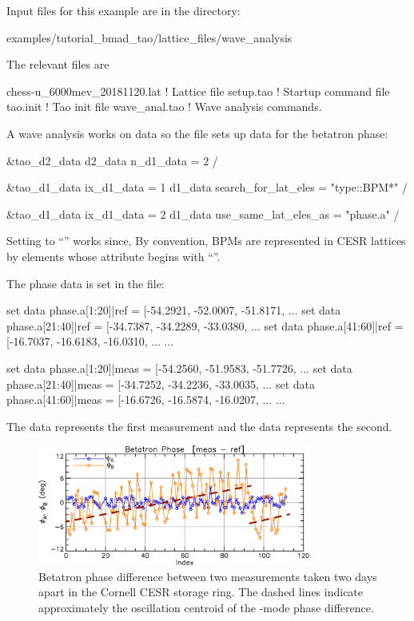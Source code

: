 \documentclass{hitec}     %
\begin{document}
Input files for this example are in the directory:
\begin{code}
examples/tutorial_bmad_tao/lattice_files/wave_analysis
\end{code}
The relevant files are 
\begin{code}
chess-u_6000mev_20181120.lat    ! Lattice file
setup.tao                       ! Startup command file
tao.init                        ! Tao init file
wave_anal.tao                   ! Wave analysis commands.
\end{code}

A wave analysis works on data so the  file sets up data for the betatron phase:
\begin{code}
&tao_d2_data
  d2_data%
  n_d1_data = 2
/

&tao_d1_data
  ix_d1_data = 1
  d1_data%
  search_for_lat_eles = "type::BPM*"
/

&tao_d1_data
  ix_d1_data = 2
  d1_data%
  use_same_lat_eles_as = "phase.a"
/
\end{code}
Setting  to ``'' works since, By convention, BPMs are
represented in CESR lattices by  elements whose  attribute begins with
``''.

The phase data is set in the  file:
\begin{code}
set data phase.a[1:20]|ref = [-54.2921, -52.0007, -51.8171, ...
set data phase.a[21:40]|ref = [-34.7387, -34.2289, -33.0380, ...
set data phase.a[41:60]|ref = [-16.7037, -16.6183, -16.0310, ...
...

set data phase.a[1:20]|meas = [-54.2560, -51.9583, -51.7726, ...
set data phase.a[21:40]|meas = [-34.7252, -34.2236, -33.0035, ...
set data phase.a[41:60]|meas = [-16.6726, -16.5874, -16.0207, ...
...
\end{code}
The  data represents the first measurement and the  data represents the second.

\begin{figure}[tb]
  \centering
  \includegraphics[width=0.8\textwidth]{betatron-phase-diff.pdf}
  \caption{
Betatron phase difference between two measurements taken two days apart in the Cornell CESR storage
ring. The dashed lines indicate approximately the oscillation centroid of the -mode phase difference.
  }
  \label{f:phase.diff}
\end{figure}
\end{document}
